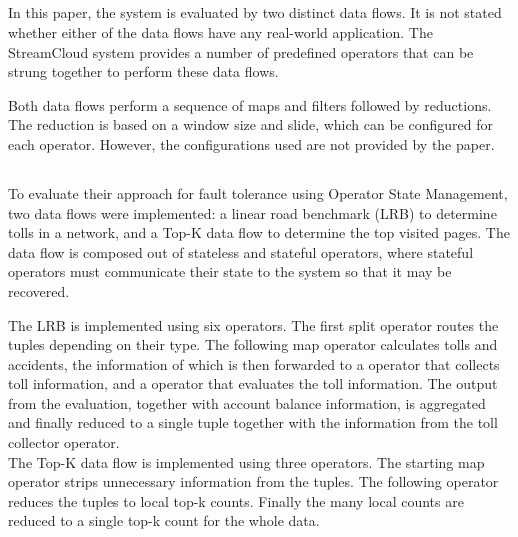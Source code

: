\subsection{}
In this paper\cite{streamcloud}, the system is evaluated by two distinct data flows. It is not stated whether either of the data flows have any real-world application. The StreamCloud system provides a number of predefined operators that can be strung together to perform these data flows. \\


Both data flows perform a sequence of maps and filters followed by reductions. The reduction is based on a window size and slide, which can be configured for each operator. However, the configurations used are not provided by the paper.

\subsection{}
To evaluate their approach for fault tolerance using Operator State Management, two data flows were implemented: a linear road benchmark (LRB) to determine tolls in a network, and a Top-K data flow to determine the top visited pages. The data flow is composed out of stateless and stateful operators, where stateful operators must communicate their state to the system so that it may be recovered. \\


The LRB is implemented using six operators. The first split operator routes the tuples depending on their type. The following map operator calculates tolls and accidents, the information of which is then forwarded to a operator that collects toll information, and a operator that evaluates the toll information. The output from the evaluation, together with account balance information, is aggregated and finally reduced to a single tuple together with the information from the toll collector operator. \\

The Top-K data flow is implemented using three operators. The starting map operator strips unnecessary information from the tuples. The following operator reduces the tuples to local top-k counts. Finally the many local counts are reduced to a single top-k count for the whole data.


